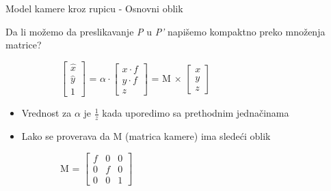 \documentclass[bookmarks=true,bookmarksopen=true,pdfborder={0 0 0},pdfhighlight={/N},linkbordercolor={.5 .5 .5},implicit=false,unicode,xcolor={table}]{beamer}
\begin{document}
\begin{frame}{Model kamere kroz rupicu - Osnovni oblik}

  Da li možemo da preslikavanje \textit{P} u \textit{P'} napišemo kompaktno preko množenja matrice?
  \begin{figure}
    \begin{subfigure}{6cm}
      $\begin{bmatrix}
        \hat{x}\\
        \hat{y}\\
        1
      \end{bmatrix}$
      = $\alpha \cdot
      \begin{bmatrix}
        x \cdot f\\
        y \cdot f\\
        z
      \end{bmatrix}$
      = M $\times$
      $\begin{bmatrix}
        x\\
        y\\
        z
      \end{bmatrix}$
    \end{subfigure}
  \end{figure}
  \begin{itemize}
    \item Vrednost za $\alpha$ je $\frac{1}{z}$ kada uporedimo sa prethodnim jednačinama
    \item Lako se proverava da M (matrica kamere) ima sledeći oblik
  \end{itemize}

  \begin{figure}
    \begin{subfigure}{4cm}
      M =
      $\begin{bmatrix}
        f & 0 & 0\\
        0 & f & 0\\
        0 & 0 & 1
      \end{bmatrix}$
    \end{subfigure}
  \end{figure}

\end{frame}
\end{document}
